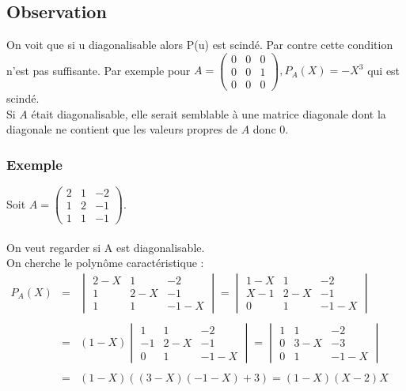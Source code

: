 \documentclass[a4paper,10pt]{book} %
\begin{document}
\subsection{Observation}
On voit que si u diagonalisable alors P(u) est scindé. Par contre cette condition n'est pas suffisante. Par exemple pour $A=\begin{pmatrix}
0&0&0\\0&0&1\\0&0&0
\end{pmatrix}, P_A(X)=-X^3$ qui est scindé.\\

Si $A$ était diagonalisable, elle serait semblable à une matrice diagonale dont la diagonale ne contient que les valeurs propres de $A$ donc 0.

\subsubsection{Exemple}
Soit $A=\begin{pmatrix}
2&1&-2\\1&2&-1\\1&1&-1
\end{pmatrix}$.\\\\

On veut regarder si A est diagonalisable.\\
On cherche le polynôme caractéristique :\\

$\begin{array}{rcl}P_A(X)&=&\begin{vmatrix}
2-X&1&-2\\1&2-X&-1\\1&1&-1-X
\end{vmatrix}=\begin{vmatrix}
1-X&1&-2\\X-1&2-X&-1\\0&1&-1-X
\end{vmatrix}\\\\
&=&(1-X)\begin{vmatrix}
1&1&-2\\-1&2-X&-1\\0&1&-1-X
\end{vmatrix}=\begin{vmatrix}
1&1&-2\\0&3-X&-3\\0&1&-1-X
\end{vmatrix}\\\\
&=&(1-X)((3-X)(-1-X)+3)=(1-X)(X-2)X\end{array}$\\
\end{document}
